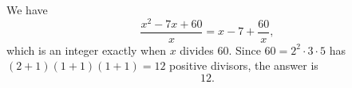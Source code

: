 We have
\[\dfrac{x^2-7x+60}{x}=x-7+\dfrac{60}{x},\]
which is an integer exactly when $x$ divides $60$. Since $60=2^2\cdot3\cdot5$ has $(2+1)(1+1)(1+1)=12$ positive divisors, the answer is
\[\boxed{12}.\]
